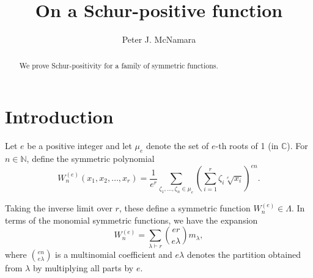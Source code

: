 \documentclass[11pt]{amsart}
\newcommand\la{\lambda}
\newcommand\C{\mathbb{C}}
\newcommand\N{\mathbb{N}}
\theoremstyle{definition}
\numberwithin{equation}{section}
\begin{document}

\title{On a Schur-positive function}

\author{Peter J. McNamara}
\address[]{
    School of Mathematics and Statistics \\
    University of Melbourne \\
    Parkville, VIC, 3010, Australia
}


\begin{abstract}
   We prove Schur-positivity for a family of symmetric functions.
\end{abstract}




\maketitle
\thispagestyle{empty}


\section{Introduction}

Let $e$ be a positive integer and let $\mu_e$ denote the set of $e$-th roots of 1 (in $\C$). For $n \in \N$, define the symmetric polynomial
\begin{equation*}
    W_n^{(e)}(x_1,x_2,\dotsc,x_r)
    = \frac{1}{e^r}
    \sum_{\zeta_1,\dotsc,\zeta_n\in \mu_e} \left( \sum_{i=1}^r \zeta_i \sqrt[e]{x_i} \right)^{en}.
\end{equation*}

Taking the inverse limit over $r$, these define a symmetric function $W_n^{(e)} \in \Lambda$.  In terms of the monomial symmetric functions, we have the expansion
\begin{equation}\label{wmonomial}
    W_n^{(e)}= \sum_{\la\vdash r} \binom{er}{e\la} m_{\la},
\end{equation}
where $\binom{en}{e\la}$ is a multinomial coefficient and $e\la$ denotes the partition obtained from $\la$ by multiplying all parts by $e$.
\end{document}
